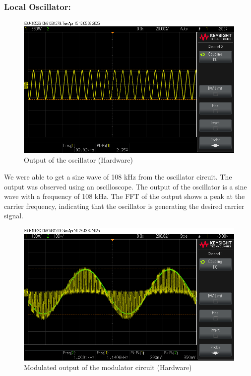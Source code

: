 \documentclass[conference]{IEEEtran}
\begin{document}
\subsubsection{Local Oscillator:}
\begin{figure}
    \centering
    \includegraphics[width=1\linewidth]{Images/osc_circuit_out.png}
    \caption{Output of the oscillator (Hardware)}
\end{figure}
We were able to get a sine wave of 108 kHz from the oscillator circuit. The output was observed using an oscilloscope. The output of the oscillator is a sine wave with a frequency of 108 kHz. The FFT of the output shows a peak at the carrier frequency, indicating that the oscillator is generating the desired carrier signal.

\begin{figure}
    \centering
    \includegraphics[width=1\linewidth]{Images/modulated_out_circuit.png}
    \caption{Modulated output of the modulator circuit (Hardware)}
\end{figure}
\end{document}
